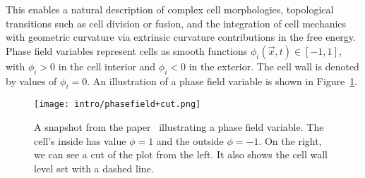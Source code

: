 This enables a natural description of complex cell morphologies, topological transitions such as cell division or fusion, and the integration of cell mechanics with geometric curvature via extrinsic curvature contributions in the free energy. \\
Phase field variables represent cells as smooth functions $\phi_i(\vec{x}, t) \in [-1, 1]$, with $\phi_i > 0$ in the cell interior and $\phi_i <0$ in the exterior. 
The cell wall is denoted by values of $\phi_i = 0$. 
An illustration of a phase field variable is shown in Figure~\ref{fig:phasefield}. \\
\begin{figure}[h!]
	\centering
	\texttt{[image: intro/phasefield+cut.png]}
	\caption{A snapshot from the paper~\cite{alert2020} illustrating a phase field variable. 
	The cell's inside has value $\phi = 1$ and the outside $\phi = -1$. 
	On the right, we can see a cut of the plot from the left. 
	It also shows the cell wall level set with a dashed line. 
	}
	\label{fig:phasefield}
\end{figure}


